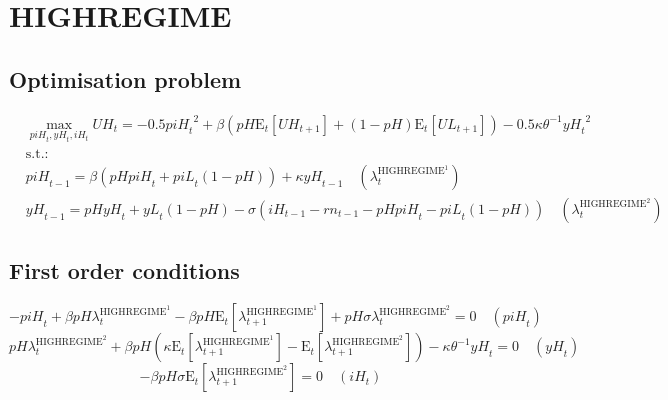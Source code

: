 

\section{HIGHREGIME}

\subsection{Optimisation problem}

\begin{align}
&\max_{{p\!i\!H}_{t}, {y\!H}_{t}, {i\!H}_{t}
} {U\!H}_{t} = -0.5{{p\!i\!H}_{t}}^{2} + {\beta} \left({{p\!H}} {\mathrm{E}_{t}\left[{U\!H}_{t+1}\right]} + \left(1 - {p\!H}\right) {\mathrm{E}_{t}\left[{U\!L}_{t+1}\right]}\right) - 0.5{\kappa} {\theta}^{-1} {{y\!H}_{t}}^{2}\\
&\mathrm{s.t.:}\nonumber\\
& {p\!i\!H}_{t-1} = {\beta} \left({{p\!H}} {{p\!i\!H}_{t}} + {{p\!i\!L}_{t}} \left(1 - {p\!H}\right)\right) + {\kappa} {{y\!H}_{t-1}} \quad \left(\lambda^{\mathrm{HIGHREGIME}^{\mathrm{1}}}_{t}\right)\\
& {y\!H}_{t-1} = {{p\!H}} {{y\!H}_{t}} + {{y\!L}_{t}} \left(1 - {p\!H}\right) - {\sigma} \left({i\!H}_{t-1} - {r\!n}_{t-1} - {{p\!H}} {{p\!i\!H}_{t}} - {{p\!i\!L}_{t}} \left(1 - {p\!H}\right)\right) \quad \left(\lambda^{\mathrm{HIGHREGIME}^{\mathrm{2}}}_{t}\right)
\end{align}


\subsection{First order conditions}

\begin{equation}
-{p\!i\!H}_{t} + {\beta} {{p\!H}} {\lambda^{\mathrm{HIGHREGIME}^{\mathrm{1}}}_{t}} - {\beta} {{p\!H}} {\mathrm{E}_{t}\left[\lambda^{\mathrm{HIGHREGIME}^{\mathrm{1}}}_{t+1}\right]} + {{p\!H}} {\sigma} {\lambda^{\mathrm{HIGHREGIME}^{\mathrm{2}}}_{t}} = 0
 \quad \left({p\!i\!H}_{t}\right)
\end{equation}
\begin{equation}
{{p\!H}} {\lambda^{\mathrm{HIGHREGIME}^{\mathrm{2}}}_{t}} + {\beta} {{p\!H}} \left({\kappa} {\mathrm{E}_{t}\left[\lambda^{\mathrm{HIGHREGIME}^{\mathrm{1}}}_{t+1}\right]} - \mathrm{E}_{t}\left[\lambda^{\mathrm{HIGHREGIME}^{\mathrm{2}}}_{t+1}\right]\right) - {\kappa} {\theta}^{-1} {{y\!H}_{t}} = 0
 \quad \left({y\!H}_{t}\right)
\end{equation}
\begin{equation}
-{\beta} {{p\!H}} {\sigma} {\mathrm{E}_{t}\left[\lambda^{\mathrm{HIGHREGIME}^{\mathrm{2}}}_{t+1}\right]} = 0
 \quad \left({i\!H}_{t}\right)
\end{equation}




